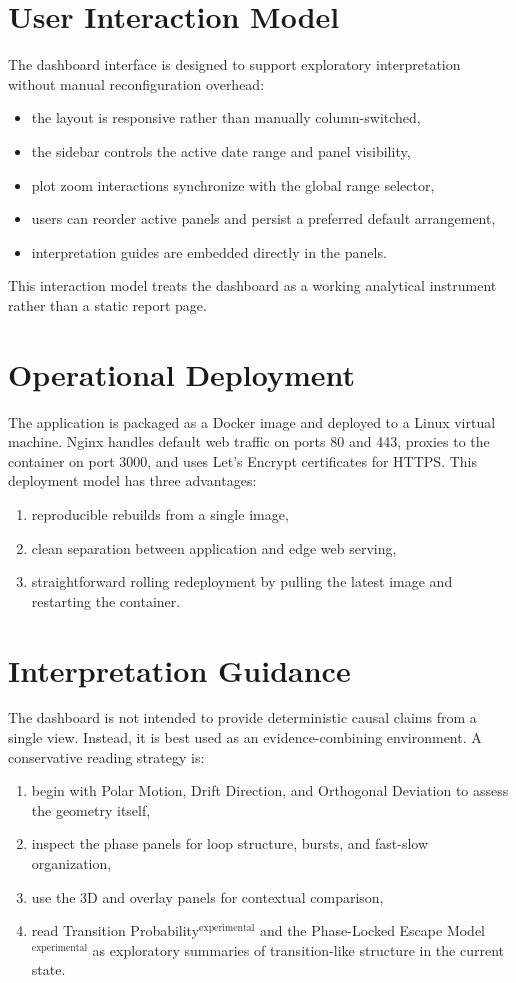 \documentclass[11pt]{article}
\begin{document}
\section{User Interaction Model}
The dashboard interface is designed to support exploratory interpretation without manual reconfiguration overhead:
\begin{itemize}[leftmargin=1.5em]
  \item the layout is responsive rather than manually column-switched,
  \item the sidebar controls the active date range and panel visibility,
  \item plot zoom interactions synchronize with the global range selector,
  \item users can reorder active panels and persist a preferred default arrangement,
  \item interpretation guides are embedded directly in the panels.
\end{itemize}

This interaction model treats the dashboard as a working analytical instrument rather than a static report page.

\section{Operational Deployment}
The application is packaged as a Docker image and deployed to a Linux virtual machine. Nginx handles default web traffic on ports 80 and 443, proxies to the container on port 3000, and uses Let's Encrypt certificates for HTTPS. This deployment model has three advantages:
\begin{enumerate}[leftmargin=1.5em]
  \item reproducible rebuilds from a single image,
  \item clean separation between application and edge web serving,
  \item straightforward rolling redeployment by pulling the latest image and restarting the container.
\end{enumerate}

\section{Interpretation Guidance}
The dashboard is not intended to provide deterministic causal claims from a single view. Instead, it is best used as an evidence-combining environment. A conservative reading strategy is:
\begin{enumerate}[leftmargin=1.5em]
  \item begin with Polar Motion, Drift Direction, and Orthogonal Deviation to assess the geometry itself,
  \item inspect the phase panels for loop structure, bursts, and fast-slow organization,
  \item use the 3D and overlay panels for contextual comparison,
  \item read Transition Probability$^{\mathrm{experimental}}$ and the Phase-Locked Escape Model$^{\mathrm{experimental}}$ as exploratory summaries of transition-like structure in the current state.
\end{enumerate}
\end{document}

